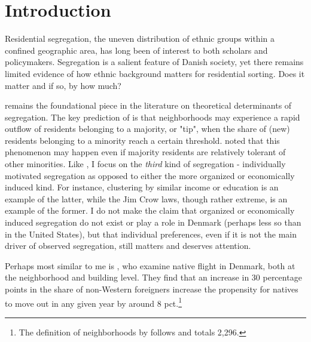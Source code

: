 \documentclass[../main.tex]{subfiles}
\begin{document}
\section{Introduction}

Residential segregation, the uneven distribution of ethnic groups within a confined geographic area, has long been of interest to both scholars and policymakers. Segregation is a salient feature of Danish society, yet there remains limited evidence of how ethnic background matters for residential sorting. Does it matter and if so, by how much?


\textcite{schelling1971dynamic} remains the foundational piece in the literature on theoretical determinants of segregation. The key prediction of \textcite{schelling1971dynamic} is that neighborhoods may experience a rapid outflow of residents belonging to a majority, or "tip", when the share of (new) residents belonging to a minority reach a certain threshold. \textcite{schelling1971dynamic} noted that this phenomenon may happen even if majority residents are relatively tolerant of other minorities. Like \textcite{schelling1971dynamic}, I focus on the \textit{third} kind of segregation - individually motivated segregation as opposed to either the more organized or economically induced kind. For instance, clustering by similar income or education is an example of the latter, while the Jim Crow laws, though rather extreme, is an example of the former. I do not make the claim that organized or economically induced segregation do not exist or play a role in Denmark (perhaps less so than in the United States), but that individual preferences, even if it is not the main driver of observed segregation, still matters and deserves attention. 

Perhaps most similar to me is \textcite{rockwool_boje2024immigrants}, who examine native flight in Denmark, both at the neighborhood and building level. They find that an increase in 30 percentage points in the share of non-Western foreigners increase the propensity for natives to move out in any given year by around 8 pct.\footnote{The definition of neighborhoods by \textcite{rockwool_boje2024immigrants} follows \textcite{damm2008danish} and totals 2,296.} 
\end{document}

